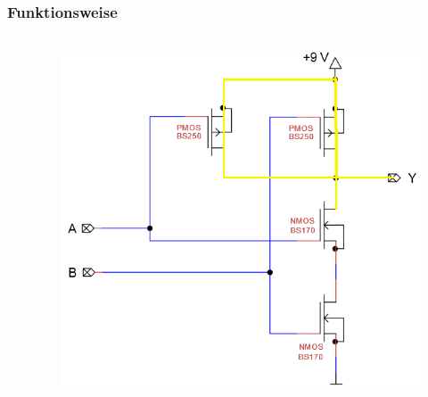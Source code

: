 \begin{frame}
    \frametitle{Funktionsweise}
    \framesubtitle{}
    \begin{columns}[c]
            \begin{center}
            \end{center}
            \begin{figure}[H]
            \begin{center}
                    \includegraphics[scale=0.5]{./img/schaltung/cmos_fun_00.png}
            \end{center}
            \end{figure}    
    \end{columns}
\end{frame}
